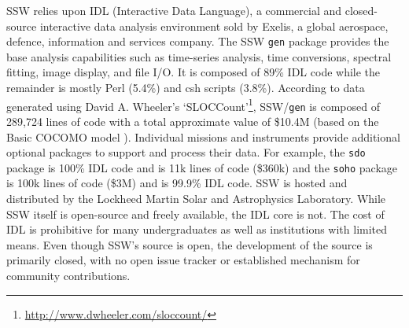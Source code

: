 SSW relies upon IDL (Interactive Data 
Language), a commercial and closed-source interactive data analysis environment 
sold by Exelis, a global aerospace, defence, information and services company. 
The SSW \texttt{gen} package provides the base analysis capabilities such as time-series
analysis, time conversions, spectral fitting, image display, and file 
I/O. It is composed of 89\% IDL code while the remainder is mostly Perl (5.4\%) 
and csh scripts (3.8\%). 
According to data generated using David A. Wheeler's 
`SLOCCount'\footnote{\url{http://www.dwheeler.com/sloccount/}}, SSW/\texttt{gen} is composed of 
289,724 lines of code with a total approximate value of \$10.4M (based on the 
Basic COCOMO model \citep{cocomo}). 
Individual missions and instruments provide additional optional packages to 
support and process their data. For example, the \texttt{sdo} package \citep{sdo} is 
100\% IDL code and is 11k lines of code (\$360k) and the \texttt{soho} package 
\citep{soho} is 100k lines of code (\$3M) and is 99.9\% IDL code. SSW is hosted 
and distributed by the Lockheed Martin Solar and Astrophysics Laboratory.
While SSW itself is open-source and freely available, the IDL core is not. The cost 
of IDL is prohibitive for many undergraduates as well as institutions 
with limited means.
Even though SSW's source is open, the development of the source is primarily closed,
with no open issue tracker or established mechanism for community contributions.

